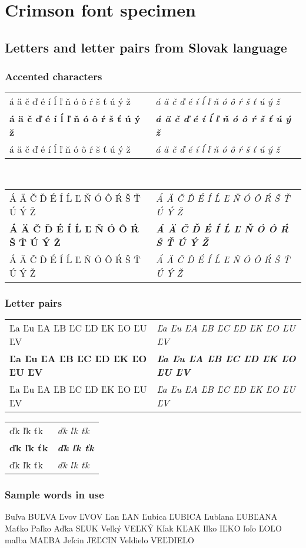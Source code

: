 ﻿\documentclass[12pt,a4paper,twoside]{article}
\makeatletter
\def\kernpairsLcaron{Ľa Ľu ĽA ĽB ĽC ĽD ĽK ĽO ĽU ĽV}
\def\kernpairsdltcaron{ďk ľk ťk}
\def\slovakaccentedalpha{á ä č ď é í ĺ ľ ň ó ô ŕ š ť ú ý ž}
\def\slovakaccentedAlpha{Á Ä Č Ď É Í Ĺ Ľ Ň Ó Ô Ŕ Š Ť Ú Ý Ž}
\newcommand\testallweights[1]{\begin{tabular}{@{}l@{\enskip}l@{}}
#1 & \textit{#1}\\
\textbf{#1} & \textit{\textbf{#1}}\\
{\crimsonbold #1} & {\crimsonbold\textit{#1}}
\end{tabular}}
\makeatother
\begin{document}
\section{Crimson font specimen}
\subsection{Letters and letter pairs from Slovak language}
\subsubsection{Accented characters}
\begin{slovak}
\testallweights{\slovakaccentedalpha}\\
\testallweights{\slovakaccentedAlpha}
\subsubsection{Letter pairs}
\testallweights{\kernpairsLcaron}
\testallweights{\kernpairsdltcaron}
\subsubsection{Sample words in use}
Buľva BUĽVA Ľvov ĽVOV Ľan ĽAN Ľubica ĽUBICA Ľubľana ĽUBĽANA Maťko Paľko Aďka SĽUK Veľký VEĽKÝ Kľak KĽAK   Iľko IĽKO ľoľo ĽOĽO maľba MAĽBA Jeľcin JEĽCIN Veľdielo VEĽDIELO
\end{slovak}
\end{document}
